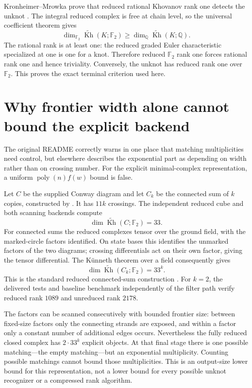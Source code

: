 \documentclass[11pt]{article}
\theoremstyle{remark}\newtheorem{remark}[theorem]{Remark}
\newcommand{\F}{\mathbb F}
\newcommand{\Q}{\mathbb Q}
\newcommand{\rKh}{\widetilde{\operatorname{Kh}}}
\newcommand{\code}[1]{\texttt{\detokenize{#1}}}
\begin{document}
Kronheimer--Mrowka prove that reduced rational Khovanov rank one detects the
unknot \cite{KM}. The integral reduced complex is free at chain level, so the
universal coefficient theorem gives
\[
 \dim_{\F_2}\rKh(K;\F_2)\ge\dim_{\Q}\rKh(K;\Q).
\]
The rational rank is at least one: the reduced graded Euler characteristic
specialized at one is one for a knot. Therefore reduced $\F_2$ rank one forces
rational rank one and hence triviality. Conversely, the unknot has reduced
rank one over $\F_2$. This proves the exact terminal criterion used here.

\section{Why frontier width alone cannot bound the explicit backend}
\label{sec:multiplicity}
The original README correctly warns in one place that matching multiplicities
need control, but elsewhere describes the exponential part as depending on
width rather than on crossing number. For the explicit minimal-complex
representation, a uniform $\operatorname{poly}(n)f(w)$ bound is false.

Let $C$ be the supplied Conway diagram and let $C_k$ be the connected sum of
$k$ copies, constructed by \code{tools/families.py}. It has $11k$ crossings.
The independent reduced cube and both scanning backends compute
\[
 \dim\rKh(C;\F_2)=33.
\]
For connected sums the reduced complexes tensor over the ground field, with
the marked-circle factors identified. On state bases this identifies the
unmarked factors of the two diagrams; crossing differentials act on their
own factor, giving the tensor differential. The K\"unneth theorem over a
field consequently gives
\begin{equation}
 \dim\rKh(C_k;\F_2)=33^k.
 \label{eq:rankpowers}
\end{equation}
This is the standard reduced connected-sum construction \cite{KhovanovPatterns}.
For $k=2$, the delivered tests and baseline benchmark independently of the
filter path verify reduced rank $1089$ and unreduced rank $2178$.

The factors can be scanned consecutively with bounded frontier size: between
fixed-size factors only the connecting strands are exposed, and within a
factor only a constant number of additional edges occurs. Nevertheless the
fully reduced closed complex has $2\cdot33^k$ explicit objects. At that final
stage there is one possible matching---the empty matching---but an exponential
multiplicity. Counting possible matchings cannot bound those multiplicities.
This is an output-size lower bound for this representation, not a lower bound
for every possible unknot recognizer or a compressed rank algorithm.
\end{document}

